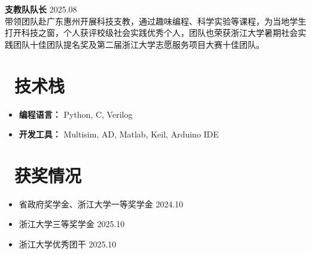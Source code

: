 \documentclass[11pt]{article}
\newlength{\intraProjectTitleSep}
\newcommand{\titlebreak}{\\[\intraProjectTitleSep]}
\begin{document}
\textbf{支教队队长} \hfill 2025.08 \titlebreak
带领团队赴广东惠州开展科技支教，通过趣味编程、科学实验等课程，为当地学生打开科技之窗，个人获评校级社会实践优秀个人，团队也荣获浙江大学暑期社会实践团队十佳团队提名奖及第二届浙江大学志愿服务项目大赛十佳团队。

\section{\makebox[\widthof{\faCogs}][c]{\color{CVBlue}\faCogs}\ 技术栈}
\begin{itemize}[nosep]
    \item \textbf{编程语言：} Python, C, Verilog
    \item \textbf{开发工具：} Multisim, AD, Matlab, Keil, Arduino IDE
\end{itemize}

\section{\makebox[\widthof{\faList}][c]{\color{CVBlue}\faList}\ 获奖情况}
\begin{itemize}[nosep]
    \item 省政府奖学金、浙江大学一等奖学金 \hfill 2024.10
    \item 浙江大学三等奖学金 \hfill 2025.10
    \item 浙江大学优秀团干 \hfill 2025.10
\end{itemize}
    
\end{document}
